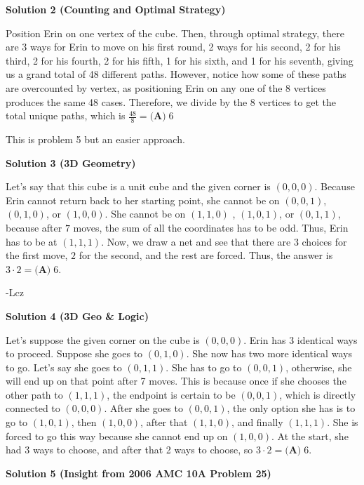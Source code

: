 \begin{enumerate}
\textbf{Solution 2 (Counting and Optimal Strategy)}

Position Erin on one vertex of the cube. Then, through optimal strategy, there are 3 ways for Erin to move on his first round, 2 ways for his second, 2 for his third, 2 for his fourth, 2 for his fifth, 1 for his sixth, and 1 for his seventh, giving us a grand total of 48 different paths. However, notice how some of these paths are overcounted by vertex, as positioning Erin on any one of the 8 vertices produces the same 48 cases. Therefore, we divide by the 8 vertices to get the total unique paths, which is $\frac{48}{8} = \boxed{\textbf{(A)}\; 6}$

 This is problem 5 but an easier approach.

 



\textbf{Solution 3 (3D Geometry)}

Let’s say that this cube is a unit cube and the given corner is $(0,0,0)$. Because Erin cannot return back to her starting point, she cannot be on $(0,0,1)$, $(0,1,0)$, or $(1,0,0)$. She cannot be on $(1,1,0)$ , $(1,0,1)$, or $(0,1,1)$, because after $7$ moves, the sum of all the coordinates has to be odd. Thus, Erin has to be at $(1,1,1)$. Now, we draw a net and see that there are $3$ choices for the first move, $2$ for the second, and the rest are forced. Thus, the answer is $3\cdot2 = \boxed{\textbf{(A)}\; 6}$.

 -Lcz

 



\textbf{Solution 4 (3D Geo & Logic)}

Let's suppose the given corner on the cube is $(0,0,0)$. Erin has 3 identical ways to proceed. Suppose she goes to $(0,1,0)$. She now has two more identical ways to go. Let's say she goes to $(0,1,1)$. She has to go to $(0,0,1)$, otherwise, she will end up on that point after 7 moves. This is because once if she chooses the other path to $(1,1,1)$, the endpoint is certain to be $(0,0,1)$, which is directly connected to $(0,0,0)$. After she goes to $(0,0,1)$, the only option she has is to go to $(1,0,1)$, then $(1,0,0)$, after that $(1,1,0)$, and finally $(1,1,1)$. She is forced to go this way because she cannot end up on $(1,0,0)$. At the start, she had 3 ways to choose, and after that 2 ways to choose, so $3\cdot2=\boxed{\textbf{(A)}\; 6}$.

 



\textbf{Solution 5 (Insight from 2006 AMC 10A Problem 25)}


\end{enumerate}

